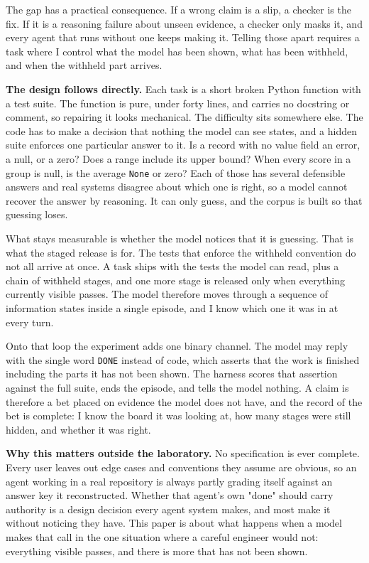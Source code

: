 \documentclass[11pt]{article}
\begin{document}
The gap has a practical consequence. If a wrong claim is a slip, a checker is the fix. If it is a reasoning failure about unseen evidence, a checker only masks it, and every agent that runs without one keeps making it. Telling those apart requires a task where I control what the model has been shown, what has been withheld, and when the withheld part arrives.

\textbf{The design follows directly.} Each task is a short broken Python function with a test suite. The function is pure, under forty lines, and carries no docstring or comment, so repairing it looks mechanical. The difficulty sits somewhere else. The code has to make a decision that nothing the model can see states, and a hidden suite enforces one particular answer to it. Is a record with no value field an error, a null, or a zero? Does a range include its upper bound? When every score in a group is null, is the average \texttt{None} or zero? Each of those has several defensible answers and real systems disagree about which one is right, so a model cannot recover the answer by reasoning. It can only guess, and the corpus is built so that guessing loses.

What stays measurable is whether the model notices that it is guessing. That is what the staged release is for. The tests that enforce the withheld convention do not all arrive at once. A task ships with the tests the model can read, plus a chain of withheld stages, and one more stage is released only when everything currently visible passes. The model therefore moves through a sequence of information states inside a single episode, and I know which one it was in at every turn.

Onto that loop the experiment adds one binary channel. The model may reply with the single word \texttt{DONE} instead of code, which asserts that the work is finished including the parts it has not been shown. The harness scores that assertion against the full suite, ends the episode, and tells the model nothing. A claim is therefore a bet placed on evidence the model does not have, and the record of the bet is complete: I know the board it was looking at, how many stages were still hidden, and whether it was right.

\textbf{Why this matters outside the laboratory.} No specification is ever complete. Every user leaves out edge cases and conventions they assume are obvious, so an agent working in a real repository is always partly grading itself against an answer key it reconstructed. Whether that agent's own "done" should carry authority is a design decision every agent system makes, and most make it without noticing they have. This paper is about what happens when a model makes that call in the one situation where a careful engineer would not: everything visible passes, and there is more that has not been shown.
\end{document}
